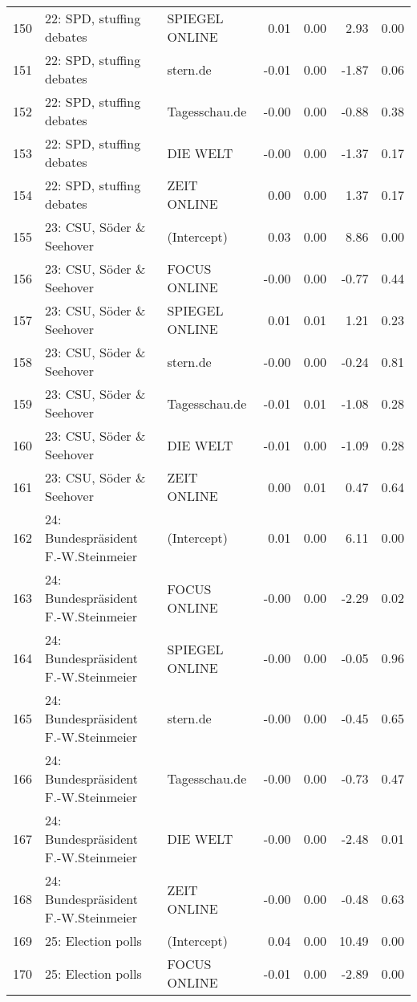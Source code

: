 \begin{table}[ht]
{\begin{tabular}{rllrrrr}
  150 & 22: SPD, stuffing debates & SPIEGEL ONLINE & 0.01 & 0.00 & 2.93 & 0.00 \\ 
  151 & 22: SPD, stuffing debates & stern.de & -0.01 & 0.00 & -1.87 & 0.06 \\ 
  152 & 22: SPD, stuffing debates & Tagesschau.de & -0.00 & 0.00 & -0.88 & 0.38 \\ 
  153 & 22: SPD, stuffing debates & DIE WELT & -0.00 & 0.00 & -1.37 & 0.17 \\ 
  154 & 22: SPD, stuffing debates & ZEIT ONLINE & 0.00 & 0.00 & 1.37 & 0.17 \\ 
  155 & 23: CSU, Söder \& Seehover & (Intercept) & 0.03 & 0.00 & 8.86 & 0.00 \\ 
  156 & 23: CSU, Söder \& Seehover & FOCUS ONLINE & -0.00 & 0.00 & -0.77 & 0.44 \\ 
  157 & 23: CSU, Söder \& Seehover & SPIEGEL ONLINE & 0.01 & 0.01 & 1.21 & 0.23 \\ 
  158 & 23: CSU, Söder \& Seehover & stern.de & -0.00 & 0.00 & -0.24 & 0.81 \\ 
  159 & 23: CSU, Söder \& Seehover & Tagesschau.de & -0.01 & 0.01 & -1.08 & 0.28 \\ 
  160 & 23: CSU, Söder \& Seehover & DIE WELT & -0.01 & 0.00 & -1.09 & 0.28 \\ 
  161 & 23: CSU, Söder \& Seehover & ZEIT ONLINE & 0.00 & 0.01 & 0.47 & 0.64 \\ 
  162 & 24: Bundespräsident F.-W.Steinmeier & (Intercept) & 0.01 & 0.00 & 6.11 & 0.00 \\ 
  163 & 24: Bundespräsident F.-W.Steinmeier & FOCUS ONLINE & -0.00 & 0.00 & -2.29 & 0.02 \\ 
  164 & 24: Bundespräsident F.-W.Steinmeier & SPIEGEL ONLINE & -0.00 & 0.00 & -0.05 & 0.96 \\ 
  165 & 24: Bundespräsident F.-W.Steinmeier & stern.de & -0.00 & 0.00 & -0.45 & 0.65 \\ 
  166 & 24: Bundespräsident F.-W.Steinmeier & Tagesschau.de & -0.00 & 0.00 & -0.73 & 0.47 \\ 
  167 & 24: Bundespräsident F.-W.Steinmeier & DIE WELT & -0.00 & 0.00 & -2.48 & 0.01 \\ 
  168 & 24: Bundespräsident F.-W.Steinmeier & ZEIT ONLINE & -0.00 & 0.00 & -0.48 & 0.63 \\ 
  169 & 25: Election polls & (Intercept) & 0.04 & 0.00 & 10.49 & 0.00 \\ 
  170 & 25: Election polls & FOCUS ONLINE & -0.01 & 0.00 & -2.89 & 0.00 \\ 

\end{tabular}}
\end{table}
